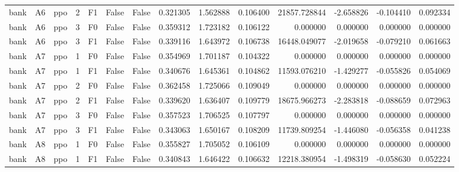 \begin{tabular}{lllrlllrrrrrrr}
      bank &      A6 &       ppo &     2 &  F1 &           False &            False &  0.321305 &  1.562888 & 0.106400 &     21857.728844 &          -2.658826 &       -0.104410 &            0.092334 \\
      bank &      A6 &       ppo &     3 &  F0 &           False &            False &  0.359312 &  1.723182 & 0.106122 &         0.000000 &           0.000000 &        0.000000 &            0.000000 \\
      bank &      A6 &       ppo &     3 &  F1 &           False &            False &  0.339116 &  1.643972 & 0.106738 &     16448.049077 &          -2.019658 &       -0.079210 &            0.061663 \\
      bank &      A7 &       ppo &     1 &  F0 &           False &            False &  0.354969 &  1.701187 & 0.104322 &         0.000000 &           0.000000 &        0.000000 &            0.000000 \\
      bank &      A7 &       ppo &     1 &  F1 &           False &            False &  0.340676 &  1.645361 & 0.104862 &     11593.076210 &          -1.429277 &       -0.055826 &            0.054069 \\
      bank &      A7 &       ppo &     2 &  F0 &           False &            False &  0.362458 &  1.725066 & 0.109049 &         0.000000 &           0.000000 &        0.000000 &            0.000000 \\
      bank &      A7 &       ppo &     2 &  F1 &           False &            False &  0.339620 &  1.636407 & 0.109779 &     18675.966273 &          -2.283818 &       -0.088659 &            0.072963 \\
      bank &      A7 &       ppo &     3 &  F0 &           False &            False &  0.357523 &  1.706525 & 0.107797 &         0.000000 &           0.000000 &        0.000000 &            0.000000 \\
      bank &      A7 &       ppo &     3 &  F1 &           False &            False &  0.343063 &  1.650167 & 0.108209 &     11739.809254 &          -1.446080 &       -0.056358 &            0.041238 \\
      bank &      A8 &       ppo &     1 &  F0 &           False &            False &  0.355827 &  1.705052 & 0.106109 &         0.000000 &           0.000000 &        0.000000 &            0.000000 \\
      bank &      A8 &       ppo &     1 &  F1 &           False &            False &  0.340843 &  1.646422 & 0.106632 &     12218.380954 &          -1.498319 &       -0.058630 &            0.052224 \\

\end{tabular}
